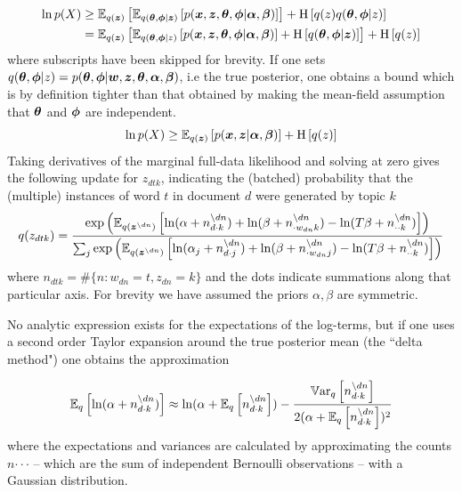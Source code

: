 \begin{align}
\ln p(X) & \geq \ex{\ex{p(\vv{x},\vv{z},\vv{\theta},\vv{\phi}|\vv{\alpha},\vv{\beta})}{q(\vv{\theta},\vv{\phi}|\vv{z})}}{q(\vv{z})}
+\ent{q(z)q(\vv{\theta},\vv{\phi}|z)}\\
& = \ex{\ex{p(\vv{x},\vv{z},\vv{\theta},\vv{\phi}|\vv{\alpha},\vv{\beta})}{q(\vv{\theta},\vv{\phi}|z)} + \ent{q(\vv{\theta},\vv{\phi}|\vv{z})}}{q(\vv{z})}
+\ent{q(z)} 
\end{align}
where subscripts have been skipped for brevity. If one sets $q(\vv{\theta},\vv{\phi}|z) = p(\vv{\theta},\vv{\phi}|\vv{w},\vv{z},\vv{\theta},\vv{\alpha},\vv{\beta})$, i.e the true posterior, one obtains a bound which is by definition tighter than that obtained by making the mean-field assumption that $\vv{\theta}$ and $\vv{\phi}$ are independent. 
\begin{equation}
\ln p(X) \geq \ex{p(\vv{x},\vv{z}|\vv{\alpha},\vv{\beta})}{q(\vv{z})} + \ent{q(z)}
\end{equation}
Taking derivatives of the marginal full-data likelihood and solving at zero gives the following update for $z_{dtk}$, indicating the (batched) probability that the (multiple) instances of word $t$ in document $d$ were generated by topic $k$
{\small
\begin{align}
q(z_{dtk}) =
\frac{
    \exp\left(
        \ex{
            \ln(\alpha + n_{d\cdot k}^{\setminus dn})
            +\ln(\beta + n_{\cdot w_{dn} k}^{\setminus dn})
            -\ln(T \beta + n_{\cdot \cdot k}^{\setminus dn})
        }{q(\vv{z}^{\setminus dn})}
    \right)
} {
    \sum_j \exp \left(
        \ex{
            \ln(\alpha_j + n_{d\cdot j}^{\setminus dn})
            +\ln(\beta + n_{\cdot w_{dn} j}^{\setminus dn})
            -\ln(T \beta + n_{\cdot \cdot k}^{\setminus dn})
        }{q(\vv{z}^{\setminus dn})}
    \right)
}
\end{align}
}
where $n_{dtk} = \#\{n : w_{dn} = t, z_{dn} = k\}$ and the dots indicate summations along that particular axis. For brevity we have assumed the priors $\alpha, \beta$ are symmetric.

No analytic expression exists for the expectations of the log-terms, but if one uses a second order Taylor expansion around the true posterior mean (the ``delta method"\cite{Wang2013}) one obtains the approximation

\begin{align}
\ex{\ln(\alpha + n_{d\cdot k}^{\setminus dn})}{q}
\approx
\ln(\alpha + \ex{n_{d\cdot k}^{\setminus dn}}{q})
- \frac{
    \var{n_{d\cdot k}^{\setminus dn}}{q}
  } {
      2 (\alpha + \ex{n_{d\cdot k}^{\setminus dn}}{q})^2 
  }
\end{align}
where the expectations and variances are calculated by approximating the counts $n{\cdot \cdot \cdot}$ -- which are the sum of independent Bernoulli observations -- with a Gaussian distribution.

